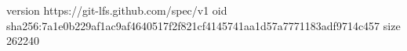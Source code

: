 version https://git-lfs.github.com/spec/v1
oid sha256:7a1e0b229af1ac9af4640517f2f821cf4145741aa1d57a7771183adf9714c457
size 262240
